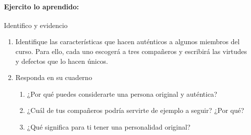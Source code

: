 \documentclass[10pt,twoside]{article}
\begin{document}
\paragraph*{Ejercito lo aprendido:} Identifico y evidencio
\begin{enumerate}
\item Identifique las características que hacen auténticos a
algunos miembros del curso. Para ello, cada uno escogerá a tres compañeros y escribirá las virtudes y defectos que lo hacen únicos.
\item Responda en su cuaderno
\begin{enumerate}
\item ¿Por qué puedes considerarte una persona original y
auténtica?
\item ¿Cuál de tus compañeros podría servirte de ejemplo a
seguir? ¿Por qué?
\item ¿Qué significa para ti tener una personalidad
original?
\end{enumerate}
\end{enumerate}
\end{document}
